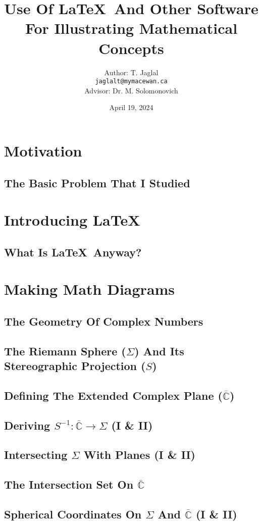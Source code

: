 \documentclass[24pt]{beamer}
\title{{\bf{}Use Of \LaTeX\  And Other Software For Illustrating Mathematical Concepts}}
\author{Author: T. Jaglal\\[1ex] \texttt{jaglalt@mymacewan.ca}\\[2ex] Advisor: Dr. M. Solomonovich}
\institute{MacEwan University, Department of Mathematics}
\date{April 19, 2024}
\begin{document}
\begin{frame}
\titlepage
\end{frame}


\section{Motivation}
\subsection{The Basic Problem That I Studied}
\section{Introducing \LaTeX}
\subsection{What Is \LaTeX\ Anyway?}
\section{Making Math Diagrams}
\subsection{The Geometry Of Complex Numbers}
\subsection{The Riemann Sphere ($\Sigma$) And Its Stereographic Projection ($S$)}
\subsection{Defining The Extended Complex Plane ($\overline{\mathbb{C}}$)}
\subsection{Deriving $S^{-1}:\overline{\mathbb{C}}\to\Sigma$ (I \& II)}
\subsection{Intersecting $\Sigma$ With Planes (I \& II)}
\subsection{The Intersection Set On $\overline{\mathbb{C}}$}
\subsection{Spherical Coordinates On $\Sigma$ And $\overline{\mathbb{C}}$ (I \& II)}
\end{document}
